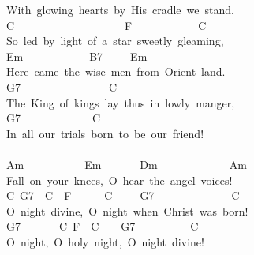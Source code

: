 \documentclass[]{book}
\begin{document}
With~glowing~hearts~by~His~cradle~we~stand.\\
C~~~~~~~~~~~~~~~~~~~~F~~~~~~~~~~~~C\\
So~led~by~light~of~a~star~sweetly~gleaming,\\
\hspace*{0.333em}\hspace*{0.333em}\hspace*{0.333em}\hspace*{0.333em}\hspace*{0.333em}\hspace*{0.333em}\hspace*{0.333em}\hspace*{0.333em}\hspace*{0.333em}\hspace*{0.333em}\hspace*{0.333em}\hspace*{0.333em}\hspace*{0.333em}\hspace*{0.333em}Em~~~~~~~~~~~~B7~~~~~Em\\
Here~came~the~wise~men~from~Orient~land.\\
\hspace*{0.333em}\hspace*{0.333em}\hspace*{0.333em}\hspace*{0.333em}G7~~~~~~~~~~~~~~~~C\\
The~King~of~kings~lay~thus~in~lowly~manger,\\
\hspace*{0.333em}\hspace*{0.333em}\hspace*{0.333em}G7~~~~~~~~~~~~~C\\
In~all~our~trials~born~to~be~our~friend!\\
~\\
Am~~~~~~~~~~~Em~~~~~~~Dm~~~~~~~~~~~~~Am\\
Fall~on~your~knees,~O~hear~the~angel~voices!\\
\hspace*{0.333em}\hspace*{0.333em}C~G7~~C~~F~~~~~~C~~~~~G7~~~~~~~~~~~~~~C\\
O~night~divine,~O~night~when~Christ~was~born!\\
\hspace*{0.333em}\hspace*{0.333em}G7~~~~~~~C~F~~C~~~~G7~~~~~~~~~~C\\
O~night,~O~holy~night,~O~night~divine!\\
\end{document}
